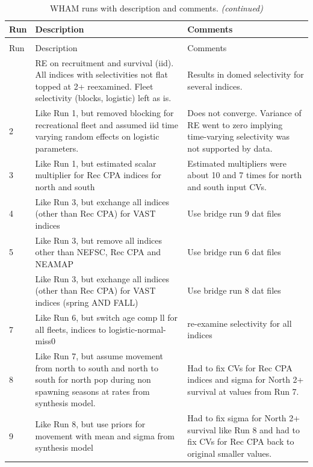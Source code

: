 \documentclass[
]{article}
\begin{document}
\begin{landscape}
\begin{longtable}[t]{l>{\raggedright\arraybackslash}p{10cm}>{\raggedright\arraybackslash}p{12cm}}
\caption{\label{tab:wham-runs}WHAM runs with description and comments.}\\
\toprule
Run & Description & Comments\\
\midrule
\endfirsthead
\caption[]{\label{tab:wham-runs}WHAM runs with description and comments. \textit{(continued)}}\\
\toprule
Run & Description & Comments\\
\midrule
\endhead

\endfoot
\bottomrule
\endlastfoot
1 & RE on recruitment and survival (iid). All indices with selectivities not flat topped at 2+ reexamined. Fleet selectivity (blocks, logistic) left as is. & Results in domed selectivity for several indices.\\
2 & Like Run 1, but removed blocking for recreational fleet and assumed iid time varying random effects on logistic parameters. & Does not converge. Variance of RE went to zero implying time-varying selectivity was not supported by data.\\
3 & Like Run 1, but estimated scalar multiplier for Rec CPA indices for north and south & Estimated multipliers were about 10 and 7 times for north and south input CVs.\\
4 & Like Run 3, but exchange all indices (other than Rec CPA) for VAST indices & Use bridge run 9 dat files\\
5 & Like Run 3, but remove all indices other than NEFSC, Rec CPA and NEAMAP & Use bridge run 6 dat files\\
\addlinespace
6 & Like Run 3, but exchange all indices (other than Rec CPA) for VAST indices (spring AND FALL) & Use bridge run 8 dat files\\
7 & Like Run 6, but switch age comp ll for all fleets, indices to logistic-normal-miss0 & re-examine selectivity for all indices\\
8 & Like Run 7, but assume movement from north to south and north to south for north pop during non spawning seasons at rates from synthesis model. & Had to fix CVs for Rec CPA indices and sigma for North 2+ survival at values from Run 7.\\
9 & Like Run 8, but use priors for movement with mean and sigma from synthesis model & Had to fix sigma for North 2+ survival like Run 8 and had to fix CVs for Rec CPA back to original smaller values.\\

\end{longtable}
\end{landscape}
\end{document}
